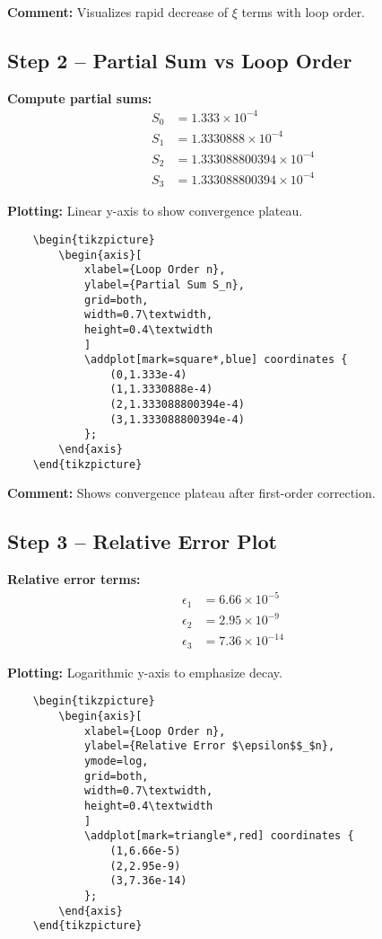 \documentclass[12pt,a4paper]{article}
\begin{document}
\textbf{Comment:} Visualizes rapid decrease of $\xi$ terms with loop order.

\subsection{Step 2 – Partial Sum vs Loop Order}

\textbf{Compute partial sums:}
\begin{align}
	S_0 &= 1.333 \times 10^{-4} \\
	S_1 &= 1.3330888 \times 10^{-4} \\
	S_2 &= 1.333088800394 \times 10^{-4} \\
	S_3 &= 1.333088800394 \times 10^{-4}
\end{align}

\textbf{Plotting:} Linear y-axis to show convergence plateau.
\begin{verbatim}
	\begin{tikzpicture}
		\begin{axis}[
			xlabel={Loop Order n},
			ylabel={Partial Sum S_n},
			grid=both,
			width=0.7\textwidth,
			height=0.4\textwidth
			]
			\addplot[mark=square*,blue] coordinates {
				(0,1.333e-4)
				(1,1.3330888e-4)
				(2,1.333088800394e-4)
				(3,1.333088800394e-4)
			};
		\end{axis}
	\end{tikzpicture}
\end{verbatim}

\textbf{Comment:} Shows convergence plateau after first-order correction.

\subsection{Step 3 – Relative Error Plot}

\textbf{Relative error terms:}
\begin{align}
	\epsilon_1 &= 6.66 \times 10^{-5} \\
	\epsilon_2 &= 2.95 \times 10^{-9} \\
	\epsilon_3 &= 7.36 \times 10^{-14}
\end{align}

\textbf{Plotting:} Logarithmic y-axis to emphasize decay.
\begin{verbatim}
	\begin{tikzpicture}
		\begin{axis}[
			xlabel={Loop Order n},
			ylabel={Relative Error $\epsilon$$_$n},
			ymode=log,
			grid=both,
			width=0.7\textwidth,
			height=0.4\textwidth
			]
			\addplot[mark=triangle*,red] coordinates {
				(1,6.66e-5)
				(2,2.95e-9)
				(3,7.36e-14)
			};
		\end{axis}
	\end{tikzpicture}
\end{verbatim}
\end{document}
